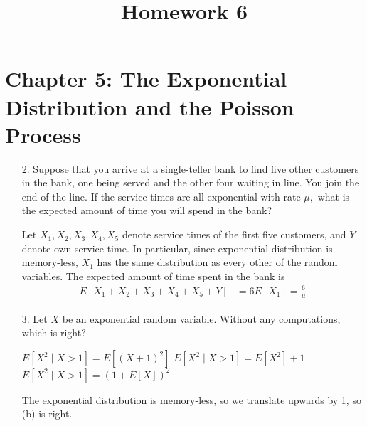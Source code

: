 \documentclass{article}
\begin{document}
\title{Homework 6}
\maketitle
\thispagestyle{fancy}

\section*{Chapter 5: The Exponential Distribution and the Poisson Process}

\begin{itemize}
	\item[2.] Suppose that you arrive at a single-teller bank to find five other customers in the bank, one being served and the other four waiting in line. You join the end of the line. If the service times are all exponential with rate $\mu,$ what is the expected amount of time you will spend in the bank?
		\begin{soln}
			Let $X_1, X_2, X_3, X_4, X_5$ denote service times of the first five customers, and $Y$ denote own service time. In particular, since exponential distribution is memory-less, $X_1$ has the same distribution as every other of the random variables. The expected amount of time spent in the bank is
			\begin{align*}
				E[X_1+X_2+X_3+X_4+X_5+Y] &= 6E[X_1] = \frac{6}{\mu}
			\end{align*}
		\end{soln}

	\item[3.] Let $X$ be an exponential random variable. Without any computations, which is right?
		\begin{enumerate}[(a)]
				\ii $E[X^2\mid X>1]=E[(X+1)^2]$ 
				\ii $E[X^2\mid X>1]=E[X^2]+1$
				\ii $E[X^2\mid X>1]=(1+E[X])^2$
		\end{enumerate}
		\begin{answer*}
			The exponential distribution is memory-less, so we translate upwards by 1, so (b) is right.
		\end{answer*}


\end{itemize}
\end{document}
